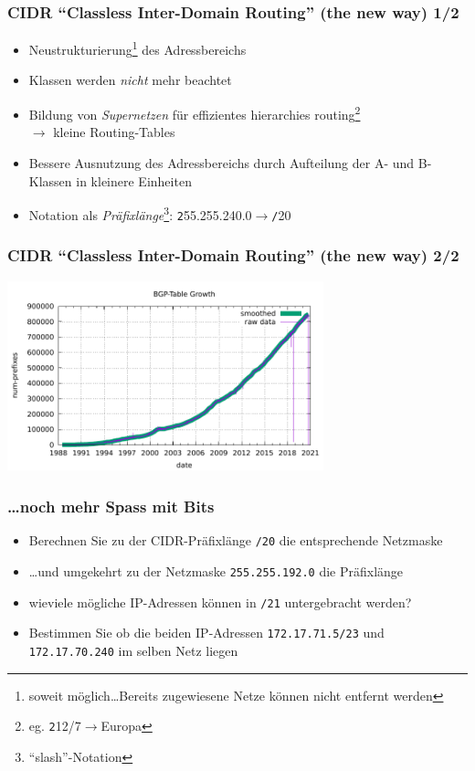 \documentclass{beamer}
\begin{document}
\begin{frame}
\frametitle{CIDR ``Classless Inter-Domain Routing'' (the new way) 1/2}
\begin{itemize}
	\item{Neustrukturierung\footnote{soweit m\"oglich\ldots Bereits zugewiesene Netze k\"onnen nicht entfernt werden} des Adressbereichs}
	\item{Klassen werden {\em nicht} mehr beachtet}
	\item{Bildung von {\em Supernetzen} f\"ur effizientes hierarchies routing\footnote{eg. {\texttt 212/7$\rightarrow$Europa}}\\$\rightarrow$ kleine Routing-Tables}
	\item{Bessere Ausnutzung des Adressbereichs durch Aufteilung der A- und B-Klassen in kleinere Einheiten}
  \item{Notation als {\em Pr\"afixl\"ange}\footnote{``slash''-Notation}: {\texttt 255.255.240.0}$\rightarrow${\texttt /20}}
\end{itemize}
\end{frame}

\begin{frame}
\frametitle{CIDR ``Classless Inter-Domain Routing'' (the new way) 2/2}
\begin{center}
\includegraphics[height=5.5cm]{bgp-growth.pdf}
\end{center}
{\tiny }
\end{frame}


\begin{frame}
\frametitle{\ldots noch mehr Spass mit Bits}
\begin{itemize}
\item{Berechnen Sie zu der CIDR-Pr\"afixl\"ange \texttt{/20} die entsprechende Netzmaske}
\item{\ldots und umgekehrt zu der Netzmaske \texttt{255.255.192.0} die Pr\"afixl\"ange}
\item{wieviele m\"ogliche IP-Adressen k\"onnen in \texttt{/21} untergebracht werden?}
\item{Bestimmen Sie ob die beiden IP-Adressen \texttt{172.17.71.5/23} und \texttt{172.17.70.240} im selben Netz liegen}
\end{itemize}
\end{frame}
\end{document}
